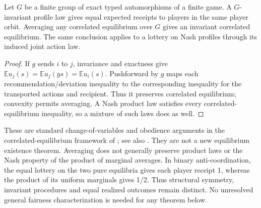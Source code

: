 \begin{proposition}\label{prop:invariant-recommendations}
Let $G$ be a finite group of exact typed automorphisms of a finite game.
A $G$-invariant profile law gives equal expected receipts to players in the
same player orbit. Averaging any correlated equilibrium over $G$ gives an
invariant correlated equilibrium. The same conclusion applies to a lottery
on Nash profiles through its induced joint action law.
\end{proposition}
\begin{proof}
If $g$ sends $i$ to $j$, invariance and exactness give
$\mathbb E u_j(s)=\mathbb E u_j(gs)=\mathbb E u_i(s)$.
Pushforward by $g$ maps each recommendation/deviation inequality to the
corresponding inequality for the transported actions and recipient. Thus it
preserves correlated equilibrium; convexity permits averaging. A Nash product
law satisfies every correlated-equilibrium inequality, so a mixture of such
laws does as well.
\end{proof}
These are standard change-of-variables and obedience arguments in the
correlated-equilibrium framework of \citet{aumann1974}; see also
\citet{hart1989}. They are not a new equilibrium existence theorem. Averaging does not generally preserve product
laws or the Nash property of the product of marginal averages. In binary
anti-coordination, the equal lottery on the two pure equilibria gives each
player receipt 1, whereas the product of its uniform marginals gives 1/2.
Thus structural symmetry, invariant procedures and equal realized outcomes
remain distinct. No unresolved general fairness characterization is needed
for any theorem below.
